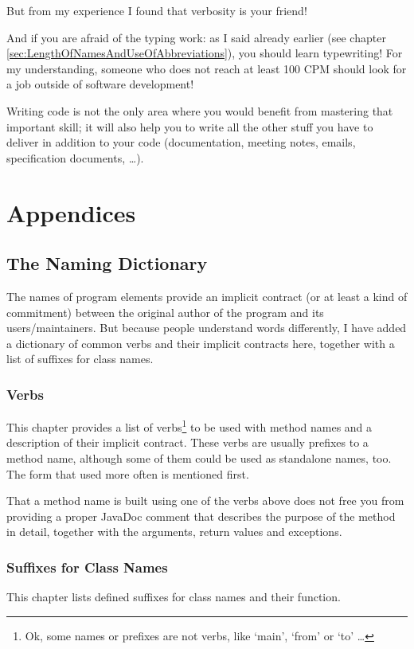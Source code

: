 \documentclass[12pt,a4paper,titlepage, parskip=half, headsepline, footsepline, cleardoubleplain]{scrbook}
\newcommand*{\tqref}[1]{\hyperref[{#1}]{\ref*{#1}}}
\begin{document}
But from my experience I found that verbosity is your friend!

And if you are afraid of the typing work: as I said already earlier (see chapter \tqref{sec:LengthOfNamesAndUseOfAbbreviations}), you should learn typewriting! For my understanding, someone who does not reach at least 100 CPM should look for a job outside of software development!

Writing code is not the only area where you would benefit from mastering that important skill; it will also help you to write all the other stuff you have to deliver in addition to your code (documentation, meeting notes, emails, specification documents, …).

\chapter{Appendices}

\section{The Naming Dictionary}\label{sec:TheNamingDictionary}
The names of program elements provide an implicit contract (or at least a kind of commitment) between the original author of the program and its users/maintainers. But because people understand words differently, I have added a dictionary of common verbs and their implicit contracts here, together with a list of suffixes for class names.

\subsection{Verbs}
This chapter provides a list of verbs\footnote{Ok, some names or prefixes are not verbs, like ‘main’, ‘from’ or ‘to’ …} to be used with method names and a description of their implicit contract. These verbs are usually prefixes to a method name, although some of them could be used as standalone names, too. The form that used more often is mentioned first.

\renewcommand{\cellalign}{tl}

That a method name is built using one of the verbs above does not free you from providing a proper JavaDoc comment that describes the purpose of the method in detail, together with the arguments, return values and exceptions.

\subsection{Suffixes for Class Names}\label{sec:SuffixesForClassNames}
This chapter lists defined suffixes for class names and their function.
\end{document}
